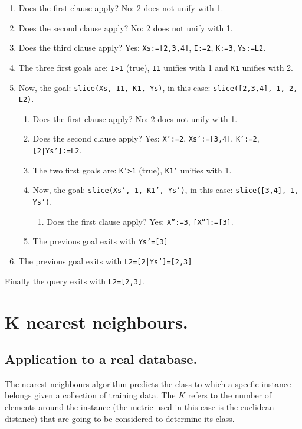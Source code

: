 \documentclass{article}
\begin{document}
\begin{enumerate}
    \item Does the first clause apply? No: 2 does not unify with 1.
    \item Does the second clause apply? No: 2 does not unify with 1.
    \item Does the third clause apply? Yes: \texttt{Xs:=[2,3,4]}, \texttt{I:=2}, \texttt{K:=3}, \texttt{Ys:=L2}. 
    \item The three first goals are: \texttt{I>1} (true), \texttt{I1} unifies with 1 and \texttt{K1} unifies with 2. 
    \item Now, the goal: \texttt{slice(Xs, I1, K1, Ys)}, in this case: \texttt{slice([2,3,4], 1, 2, L2)}.
    \begin{enumerate}
        \item Does the first clause apply? No: 2 does not unify with 1. 
        \item Does the second clause apply? Yes: \texttt{X':=2}, \texttt{Xs':=[3,4]}, \texttt{K':=2}, \texttt{[2|Ys']:=L2}.
        \item The two first goals are: \texttt{K'>1} (true), \texttt{K1'} unifies with 1. 
        \item Now, the goal: \texttt{slice(Xs', 1, K1', Ys')}, in this case: \texttt{slice([3,4], 1, Ys')}.
        \begin{enumerate}
            \item Does the first clause apply? Yes: \texttt{X'':=3}, \texttt{[X'']:=[3]}.
        \end{enumerate}
        \item The previous goal exits with \texttt{Ys'=[3]}
    \end{enumerate}
    \item The previous goal exits with \texttt{L2=[2|Ys']=[2,3]}
\end{enumerate}
Finally the query exits with \texttt{L2=[2,3]}.


\newpage
\setcounter{section}{8}
\section{K nearest neighbours.}

\setcounter{subsection}{4}
\subsection{Application to a real database.}

The nearest neighbours algorithm predicts the class to which a specfic instance belongs given a collection of training data. The $K$ refers to the number of elements around the instance (the metric used in this case is the euclidean distance) that are going to be considered to determine its class.
\end{document}
